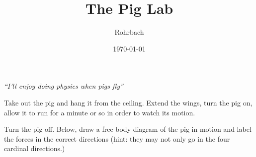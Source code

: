 \documentclass[10pt]{exam}
\title{The Pig Lab}
\author{Rohrbach}
\date{\today}
\begin{document}
\maketitle

\vspace{-.7em}

\noindent
\emph{``I'll enjoy doing physics when pigs fly''}
\vspace{1em}

\noindent
Take out the pig and hang it from the ceiling.  Extend the wings, turn the pig on, allow it to run for a minute or so in order to watch its motion.

\begin{questions}
  
\question
  Turn the pig off.  Below, draw a free-body diagram of the pig in motion and label the forces in the correct directions (hint: they may not only go in the four cardinal directions.) 


  
  
  
  

  

\end{questions}
\end{document}
